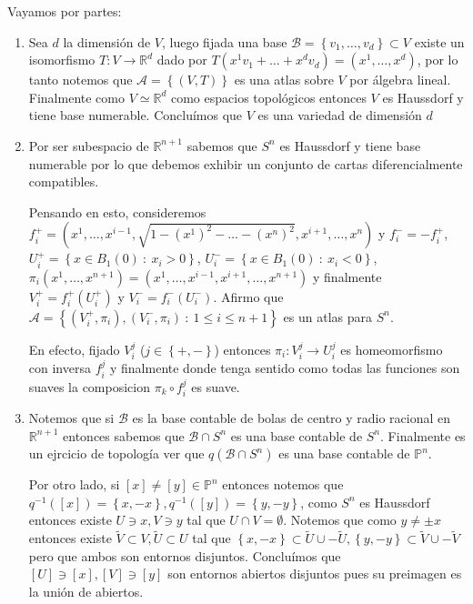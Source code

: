\documentclass[11pt]{article}
\newcommand{\B}{\mathcal{B}}
\newcommand{\A}{\mathcal{A}}
\newcommand{\R}{{\mathbb{R}}}
\newcommand\tq{~:~}
\newcommand{\sett}[1]{\left\lbrace#1\right\rbrace}
\numberwithin{theorem}{subsection}
\begin{document}
\begin{solution}
	Vayamos por partes:
	
	\begin{enumerate}
		\item Sea $d$ la dimensi\'on de $V$, luego fijada una base $\B=\sett{v_1, \dots , v_d} \subset V$ existe un isomorfismo $T:V \rightarrow \R^d$ dado por $T(x^1v_1 + \dots + x^dv_d) = (x^1, \dots , x^d)$, por lo tanto notemos que $\A = \sett{(V, T)}$ es una atlas sobre $V$ por \'algebra lineal. Finalmente como $V \simeq \R^d$ como espacios topol\'ogicos entonces $V$ es Haussdorf y tiene base numerable. Conclu\'imos que $V$ es una variedad de dimensi\'on $d$
		
		\item Por ser subespacio de $\R^{n+1}$ sabemos que $S^{n}$ es Haussdorf y tiene base numerable por lo que debemos exhibir un conjunto de cartas diferencialmente compatibles. 
		
		Pensando en esto, consideremos $f_i^+ = (x^1, \dots, x^{i-1}, \sqrt{1-(x^1)^2 - \dots - (x^n)^2} ,x^{i+1}, \dots , x^{n})$ y $f_i^- = -f_i^+$, $U_i^+ = \sett{x \in B_1(0) \tq x_i > 0}$, $U_i^- = \sett{x \in B_1(0) \tq x_i < 0}$, $\pi_i(x^1, \dots, x^{n+1}) = \left(x^1, \dots , x^{i-1}, x^{i+1}, \dots, x^{n+1}\right)$ y finalmente $V_i^+ = f_i^+(U_i^+)$ y $V_i^- = f_i^- (U_i^-)$. Afirmo que $\A = \sett{(V_i^+, \pi_i), (V_i^-, \pi_i) \tq 1 \leq i \leq n+1}$ es un atlas para $S^n$.
		
		En efecto, fijado $V^j_i$ ($j \in \sett{+,-}$) entonces $\pi_i: V^j_i \rightarrow U^j_i$ es homeomorfismo con inversa $f^j_i$ y finalmente donde tenga sentido como todas las funciones son suaves la composicion $\pi_k \circ f^j_i$ es suave.
		  
		\item Notemos que si $\B$ es la base contable de bolas de centro y radio racional en $\R^{n+1}$ entonces sabemos que $\B \cap S^{n}$ es una base contable de $S^n$. Finalmente es un ejrcicio de topolog\'ia ver que $q(\B \cap S^n)$ es una base contable de $\mathbb{P}^n$.
		
		Por otro lado, si $[x] \neq [y] \in \mathbb{P}^n$ entonces notemos que $q^{-1}([x]) = \sett{x,-x}, q^{-1}([y]) = \sett{y,-y}$, como $S^n$ es Haussdorf entonces existe $U \ni x, V \ni y$ tal que $U \cap V = \emptyset$. Notemos que como $y \neq \pm x$ entonces existe $\tilde{V} \subset V, \tilde{U} \subset U$ tal que $\sett{x,-x} \subset \tilde{U} \cup -\tilde{U}, \sett{y,-y} \subset \tilde{V} \cup -\tilde{V}$ pero que ambos son entornos disjuntos. Conclu\'imos que  $[U] \ni [x], [V] \ni [y]$ son entornos abiertos disjuntos pues su preimagen es la uni\'on de abiertos.
		

\end{enumerate}
\end{solution}
\end{document}
